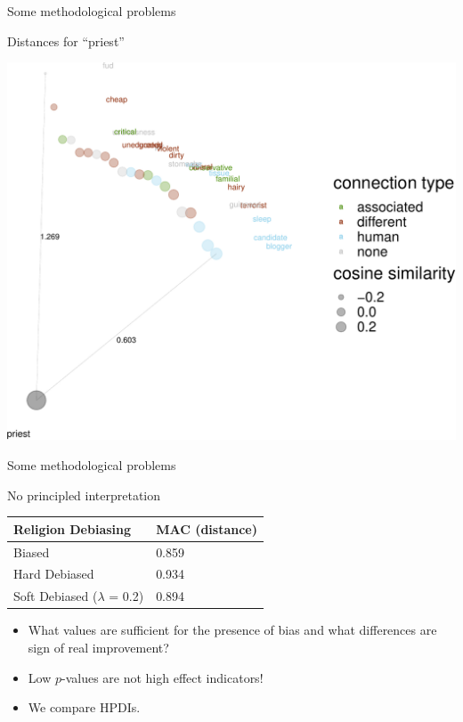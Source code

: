 \documentclass[10pt,ignorenonframetext,x11names, dvipsnames, bibspacing,natbib]{beamer}
\begin{document}
\begin{frame}{Some methodological problems}
\protect\hypertarget{some-methodological-problems-4}{}

\begin{block}{Distances for ``priest''}

\begin{center}\includegraphics[width=0.8\linewidth]{presentationESSLLI_files/figure-beamer/unnamed-chunk-5-1} \end{center}

\end{block}

\end{frame}

\begin{frame}{Some methodological problems}
\protect\hypertarget{some-methodological-problems-5}{}

\begin{block}{No principled interpretation}

\begin{longtable}[]{@{}ll@{}}
\toprule
Religion Debiasing & MAC (distance)\tabularnewline
\midrule
\endhead
Biased & 0.859\tabularnewline
Hard Debiased & 0.934\tabularnewline
Soft Debiased (\(\lambda\) = 0.2) & 0.894\tabularnewline
\bottomrule
\end{longtable}

\begin{itemize}
\item
  What values are sufficient for the presence of bias and what
  differences are sign of real improvement?
\item
  Low \(p\)-values are not high effect indicators!
\item
  We compare HPDIs.
\end{itemize}

\end{block}

\end{frame}
\end{document}
